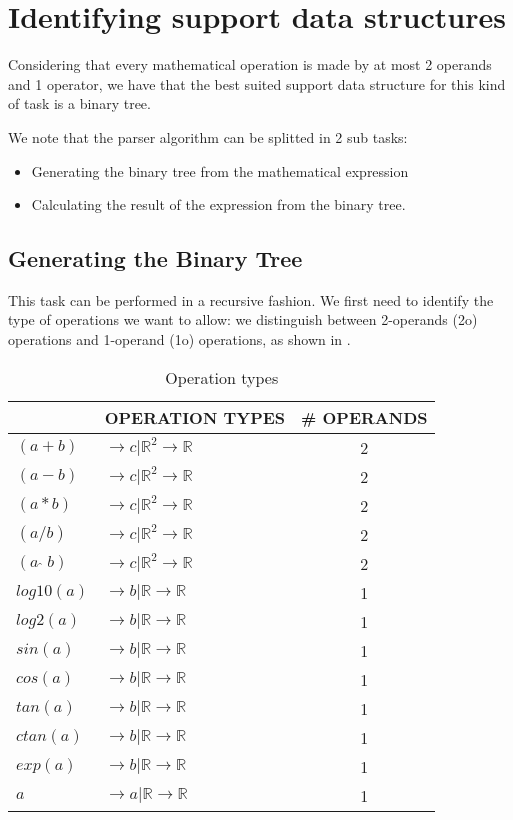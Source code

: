 \section{Identifying support data structures}

Considering that every mathematical operation is made by at most 2 operands and 1 operator, we have that the best suited support data structure for this kind of task is a binary tree.

We note that the parser algorithm can be splitted in 2 sub tasks: 
\begin{itemize}
 \item Generating the binary tree from the mathematical expression
 \item Calculating the result of the expression from the binary tree.
\end{itemize}

\subsection{Generating the Binary Tree}
This task can be performed in a recursive fashion. We first need to identify the type of operations we want to allow: we distinguish between 2-operands (2o) operations and 1-operand (1o) operations, as shown in .

\begin{table}[htbp]
\centering
\scriptsize
 \begin{tabular}{|l l|c|}
 \hline
 	& OPERATION TYPES & \# OPERANDS \\
 \hline
 	$ (a + b)$ & $\rightarrow c | \mathbb{R}^2 \rightarrow \mathbb{R}$ & 2 \\
 	$ (a - b)$ & $\rightarrow c | \mathbb{R}^2 \rightarrow \mathbb{R}$ & 2 \\
 	$ (a * b)$ & $\rightarrow c | \mathbb{R}^2 \rightarrow \mathbb{R}$ & 2 \\
 	$ (a / b)$ & $\rightarrow c | \mathbb{R}^2 \rightarrow \mathbb{R}$ & 2 \\
 	$ (a \;\hat{}\; b)$ & $\rightarrow c | \mathbb{R}^2 \rightarrow \mathbb{R}$ & 2 \\
 	$ log10(a)$ & $\rightarrow b | \mathbb{R} \rightarrow \mathbb{R}$ & 1 \\
 	$ log2(a)$ & $\rightarrow b | \mathbb{R} \rightarrow \mathbb{R}$ & 1 \\
 	$ sin(a)$ & $\rightarrow b | \mathbb{R} \rightarrow \mathbb{R}$ & 1 \\
 	$ cos(a)$ & $\rightarrow b | \mathbb{R} \rightarrow \mathbb{R}$ & 1 \\
 	$ tan(a)$ & $\rightarrow b | \mathbb{R} \rightarrow \mathbb{R}$ & 1 \\
 	$ ctan(a)$ & $\rightarrow b | \mathbb{R} \rightarrow \mathbb{R}$ & 1 \\
 	$ exp(a)$ & $\rightarrow b | \mathbb{R} \rightarrow \mathbb{R}$ & 1 \\
 	$ a$ & $\rightarrow a | \mathbb{R} \rightarrow \mathbb{R}$ & 1 \\
 \hline
 \end{tabular}
 \small
 \caption{Operation types}\label{table:000:optypes}
\end{table}

